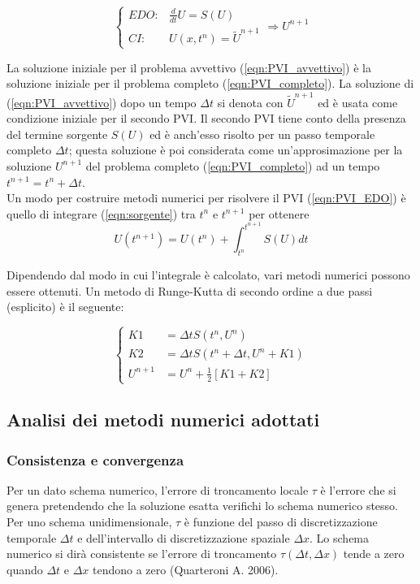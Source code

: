 \documentclass[12pt]{article} %
\begin{document}
\begin{equation}
    \left\{\begin{array}{lr}
        EDO: & \frac{d}{dt}U = S(U)\\
        CI: & U(x,t^n)=\tilde{U}^{n+1}
        \end{array}
    \right. \Longrightarrow U^{n+1}
    \label{eqn:PVI_EDO}
\end{equation}

\noindent La soluzione iniziale per il problema avvettivo (\ref{eqn:PVI_avvettivo}) è la soluzione iniziale per il problema completo (\ref{eqn:PVI_completo}). La soluzione di (\ref{eqn:PVI_avvettivo}) dopo un tempo $\Delta t$ si denota con $\tilde{U}^{n+1}$ ed è usata come condizione iniziale per il secondo PVI. Il secondo PVI tiene conto della presenza del termine sorgente $S(U)$ ed è anch'esso risolto per un passo temporale completo $\Delta t$; questa soluzione è poi considerata come un'approsimazione per la soluzione $U^{n+1}$ del problema completo (\ref{eqn:PVI_completo}) ad un tempo $t^{n+1}=t^n+\Delta t$.\\
Un modo per costruire metodi numerici per risolvere il PVI (\ref{eqn:PVI_EDO}) è quello di integrare (\ref{eqn:sorgente}) tra $t^n$ e $t^{n+1}$ per ottenere
\begin{equation}
    U(t^{n+1}) = U(t^n) + \int_{t^n}^{t^{n+1}}S(U)dt
\end{equation}

\noindent Dipendendo dal modo in cui l'integrale è calcolato, vari metodi numerici possono essere ottenuti. Un metodo di Runge-Kutta di secondo ordine a due passi (esplicito) è il seguente:

\begin{equation}
    \left\{\begin{array}{ll}
        K1 &= \Delta tS(t^n,U^n)\\
        K2 &= \Delta tS(t^n+\Delta t, U^n+K1)\\
        U^{n+1} &= U^n + \frac{1}{2}[K1+K2]
         \end{array}
    \right.
    \label{eqn:Runge-Kutta}
\end{equation}

\subsection{Analisi dei metodi numerici adottati}
\subsubsection{Consistenza e convergenza}
\noindent Per un dato schema numerico, l'errore di troncamento locale $\tau$ è l'errore che si genera pretendendo che la soluzione esatta verifichi lo schema numerico stesso.
Per uno schema unidimensionale, $\tau$ è  funzione del passo di discretizzazione temporale $\Delta t$ e  dell'intervallo di discretizzazione spaziale $\Delta x$. Lo schema numerico si dirà consistente se l'errore di troncamento $\tau(\Delta t, \Delta x)$ tende a zero quando $\Delta t$ e $\Delta x$ tendono a zero (Quarteroni A. 2006).
\end{document}
